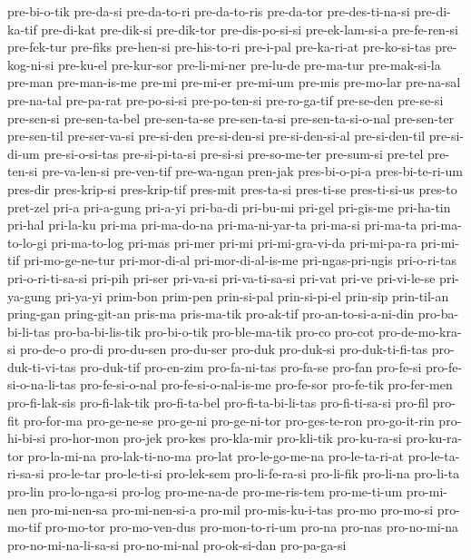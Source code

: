 {pre-bi-o-tik pre-da-si pre-da-to-ri pre-da-to-ris pre-da-tor
pre-des-ti-na-si pre-di-ka-tif pre-di-kat pre-dik-si pre-dik-tor
pre-dis-po-si-si pre-ek-lam-si-a pre-fe-ren-si pre-fek-tur pre-fiks
pre-hen-si pre-his-to-ri pre-i-pal pre-ka-ri-at pre-ko-si-tas
pre-kog-ni-si pre-ku-el pre-kur-sor pre-li-mi-ner pre-lu-de pre-ma-tur
pre-mak-si-la pre-man pre-man-is-me pre-mi pre-mi-er pre-mi-um pre-mis
pre-mo-lar pre-na-sal pre-na-tal pre-pa-rat pre-po-si-si pre-po-ten-si
pre-ro-ga-tif pre-se-den pre-se-si pre-sen-si pre-sen-ta-bel pre-sen-ta-se
pre-sen-ta-si pre-sen-ta-si-o-nal pre-sen-ter pre-sen-til pre-ser-va-si
pre-si-den pre-si-den-si pre-si-den-si-al pre-si-den-til pre-si-di-um
pre-si-o-si-tas pre-si-pi-ta-si pre-si-si pre-so-me-ter pre-sum-si pre-tel
pre-ten-si pre-va-len-si pre-ven-tif pre-wa-ngan pren-jak pres-bi-o-pi-a
pres-bi-te-ri-um pres-dir pres-krip-si pres-krip-tif pres-mit pres-ta-si
pres-ti-se pres-ti-si-us pres-to pret-zel pri-a pri-a-gung pri-a-yi
pri-ba-di pri-bu-mi pri-gel pri-gis-me pri-ha-tin pri-hal pri-la-ku pri-ma
pri-ma-do-na pri-ma-ni-yar-ta pri-ma-si pri-ma-ta pri-ma-to-lo-gi
pri-ma-to-log pri-mas pri-mer pri-mi pri-mi-gra-vi-da pri-mi-pa-ra
pri-mi-tif pri-mo-ge-ne-tur pri-mor-di-al pri-mor-di-al-is-me
pri-ngas-pri-ngis pri-o-ri-tas pri-o-ri-ti-sa-si pri-pih pri-ser pri-va-si
pri-va-ti-sa-si pri-vat pri-ve pri-vi-le-se pri-ya-gung pri-ya-yi prim-bon
prim-pen prin-si-pal prin-si-pi-el prin-sip prin-til-an pring-gan
pring-git-an pris-ma pris-ma-tik pro-ak-tif pro-an-to-si-a-ni-din
pro-ba-bi-li-tas pro-ba-bi-lis-tik pro-bi-o-tik pro-ble-ma-tik pro-co
pro-cot pro-de-mo-kra-si pro-de-o pro-di pro-du-sen pro-du-ser pro-duk
pro-duk-si pro-duk-ti-fi-tas pro-duk-ti-vi-tas pro-duk-tif pro-en-zim
pro-fa-ni-tas pro-fa-se pro-fan pro-fe-si pro-fe-si-o-na-li-tas
pro-fe-si-o-nal pro-fe-si-o-nal-is-me pro-fe-sor pro-fe-tik pro-fer-men
pro-fi-lak-sis pro-fi-lak-tik pro-fi-ta-bel pro-fi-ta-bi-li-tas
pro-fi-ti-sa-si pro-fil pro-fit pro-for-ma pro-ge-ne-se pro-ge-ni
pro-ge-ni-tor pro-ges-te-ron pro-go-it-rin pro-hi-bi-si pro-hor-mon
pro-jek pro-kes pro-kla-mir pro-kli-tik pro-ku-ra-si pro-ku-ra-tor
pro-la-mi-na pro-lak-ti-no-ma pro-lat pro-le-go-me-na pro-le-ta-ri-at
pro-le-ta-ri-sa-si pro-le-tar pro-le-ti-si pro-lek-sem pro-li-fe-ra-si
pro-li-fik pro-li-na pro-li-ta pro-lin pro-lo-nga-si pro-log pro-me-na-de
pro-me-ris-tem pro-me-ti-um pro-mi-nen pro-mi-nen-sa pro-mi-nen-si-a
pro-mil pro-mis-ku-i-tas pro-mo pro-mo-si pro-mo-tif pro-mo-tor
pro-mo-ven-dus pro-mon-to-ri-um pro-na pro-nas pro-no-mi-na
pro-no-mi-na-li-sa-si pro-no-mi-nal pro-ok-si-dan pro-pa-ga-si
}
